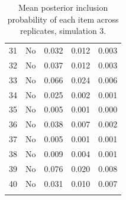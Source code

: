 \begin{longtable}{lcccc}
  31 & No & 0.032 & 0.012 & 0.003 \\ 
  32 & No & 0.037 & 0.012 & 0.003 \\ 
  33 & No & 0.066 & 0.024 & 0.006 \\ 
  34 & No & 0.025 & 0.002 & 0.001 \\ 
  35 & No & 0.005 & 0.001 & 0.000 \\ 
  36 & No & 0.038 & 0.007 & 0.002 \\ 
  37 & No & 0.005 & 0.001 & 0.001 \\ 
  38 & No & 0.009 & 0.004 & 0.001 \\ 
  39 & No & 0.076 & 0.020 & 0.008 \\ 
  40 & No & 0.031 & 0.010 & 0.007 \\ 
   \bottomrule
\caption{Mean posterior inclusion probability of each item across replicates, simulation 3.} 
\label{table:sim3_item_pip}
\end{longtable}
